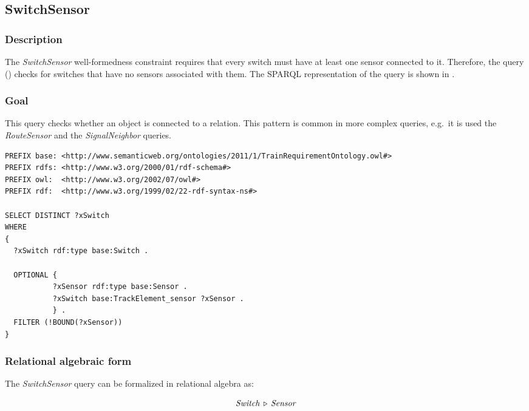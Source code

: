 \subsection{SwitchSensor}

\subsubsection{Description} The \textit{SwitchSensor} well-formedness constraint requires that every switch must have at least one sensor connected to it. Therefore, the query () checks for switches that have no sensors associated with them. The SPARQL representation of the query is shown in .

\subsubsection{Goal} This query checks whether an object is connected to a relation. This pattern is common in more complex queries, e.g.\ it is used the \textit{RouteSensor} and the \textit{SignalNeighbor} queries.

\begin{lstlisting}[caption=The RouteSensor query in SPARQL, label=lst:switchsensor-sparql]
PREFIX base: <http://www.semanticweb.org/ontologies/2011/1/TrainRequirementOntology.owl#>
PREFIX rdfs: <http://www.w3.org/2000/01/rdf-schema#>
PREFIX owl:  <http://www.w3.org/2002/07/owl#>
PREFIX rdf:  <http://www.w3.org/1999/02/22-rdf-syntax-ns#>

SELECT DISTINCT ?xSwitch
WHERE
{
  ?xSwitch rdf:type base:Switch .

  OPTIONAL { 
           ?xSensor rdf:type base:Sensor .
           ?xSwitch base:TrackElement_sensor ?xSensor .
           } .
  FILTER (!BOUND(?xSensor))
}
\end{lstlisting}


\subsubsection{Relational algebraic form} The \textit{SwitchSensor} query can be formalized in relational algebra as:

$$ \mathit{Switch} \, \triangleright \, \mathit{Sensor} $$
